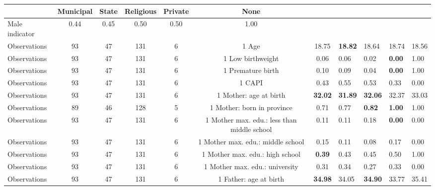 \begin{tabular}{l c c c c c c }
\toprule
& \textbf{Municipal} & \textbf{State} & \textbf{Religious} & \textbf{Private} & \textbf{None} \\
\midrule
Male indicator &      0.44 &      0.45 &      0.50 &      0.50 &      1.00 \\
\midrule
Observations &        93 &        47 &       131 &         6 &         1
Age &     18.75 & \textbf{    18.82} &     18.64 &     18.74 &     18.56 \\
\midrule
Observations &        93 &        47 &       131 &         6 &         1
Low birthweight &      0.06 &      0.06 &      0.02 & \textbf{     0.00} &      1.00 \\
\midrule
Observations &        93 &        47 &       131 &         6 &         1
Premature birth &      0.10 &      0.09 &      0.04 & \textbf{     0.00} &      1.00 \\
\midrule
Observations &        93 &        47 &       131 &         6 &         1
CAPI &      0.43 &      0.55 &      0.53 &      0.33 &      0.00 \\
\midrule
Observations &        93 &        47 &       131 &         6 &         1
Mother: age at birth & \textbf{    32.02} & \textbf{    31.89} & \textbf{    32.06} &     32.37 &     33.03 \\
\midrule
Observations &        89 &        46 &       128 &         5 &         1
Mother: born in province &      0.71 &      0.77 & \textbf{     0.82} & \textbf{     1.00} &      1.00 \\
\midrule
Observations &        93 &        47 &       131 &         6 &         1
Mother max. edu.: less than middle school &      0.11 &      0.11 &      0.18 & \textbf{     0.00} &      0.00 \\
\midrule
Observations &        93 &        47 &       131 &         6 &         1
Mother max. edu.: middle school &      0.15 &      0.11 &      0.08 &      0.17 &      0.00 \\
\midrule
Observations &        93 &        47 &       131 &         6 &         1
Mother max. edu.: high school & \textbf{     0.39} &      0.43 &      0.45 &      0.50 &      1.00 \\
\midrule
Observations &        93 &        47 &       131 &         6 &         1
Mother max. edu.: university &      0.31 &      0.34 &      0.27 &      0.33 &      0.00 \\
\midrule
Observations &        93 &        47 &       131 &         6 &         1
Father: age at birth & \textbf{    34.98} &     34.05 & \textbf{    34.90} &     33.77 &     35.41 \\

\end{tabular}

